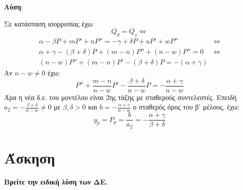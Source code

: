 \documentclass[a4paper,12pt]{article}
\begin{document}
\textbf{Λύση}:

\vspace{\baselineskip}

Σε κατάσταση ισορροπίας έχω:
\[
Q_d=Q_s \Leftrightarrow
\]
\begin{align*}
\alpha -\beta P +mP' + nP'' =-\gamma + \delta P +uP'+wP'' &\Leftrightarrow\\
\alpha+\gamma-(\beta+\delta)P +(m-n)P''+(n-w)P'' = 0 &\Leftrightarrow \\
(n-w)P'' + (m-n)P'-(\beta+\delta)P =-(\alpha+\gamma)&
\end{align*}
Αν $n-w\neq0$ έχω:
\[
P''+\frac{m-n}{n-w}P'-\frac{\beta+\delta}{n-w}P = -\frac{\alpha+\gamma}{n-w}
\]
Άρα η νέα δ.ε. του μοντέλου είναι $2$ης τάξης με σταθερούς συντελεστές. Επειδή $a_2=-\frac{\beta+\delta}{n-w}\neq0$ με $\beta,\delta>0$ και $b=-\frac{\alpha+\gamma}{n-w}$ ο σταθερός όρος του β' μέλους, έχω:
\[
y_p=P_p=\frac{b}{a_2}=-\frac{\alpha+\gamma}{\beta+\delta}
\]

\vspace{2\baselineskip}

\section{Άσκηση}  {\bfseries Βρείτε την ειδική λύση των ΔΕ.}

\vspace{2\baselineskip}
\end{document}
